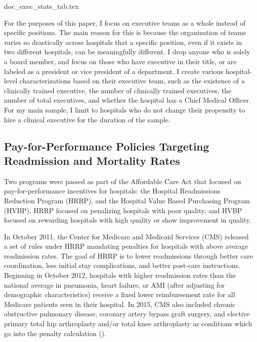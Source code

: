 \documentclass[12pt]{article}
\begin{document}
    {doc_exec_stats_tab.tex}

    For the purposes of this paper, I focus on executive teams as a whole instead of specific positions. The main reason for this is because the organization of teams varies so drastically across hospitals that a specific position, even if it exists in two different hospitals, can be meaningfully different. I drop anyone who is solely a board member, and focus on those who have executive in their title, or are labeled as a president or vice president of a department. I create various hospital-level characterizations based on their executive team, such as the existence of a clinically trained executive, the number of clinically trained executives, the number of total executives, and whether the hospital has a Chief Medical Officer. For my main sample, I limit to hospitals who do not change their propensity to hire a clinical executive for the duration of the sample. 
  
    \subsection{Pay-for-Performance Policies Targeting Readmission and Mortality Rates}\label{sec:hrrp}

    Two programs were passed as part of the Affordable Care Act that focused on pay-for-performance incentives for hospitals: the Hospital Readmissions Reduction Program (HRRP), and the Hospital Value Based Purchasing Program (HVBP). HRRP focused on penalizing hospitals with poor quality, and HVBP focused on rewarding hospitals with high quality or show improvement in quality. 

    In October 2011, the Center for Medicare and Medicaid Services (CMS) released a set of rules under HRRP mandating penalties for hospitals with above average readmission rates. The goal of HRRP is to lower readmissions through better care coordination, less initial stay complications, and better post-care instructions. Beginning in October 2012, hospitals with higher readmission rates than the national average in pneumonia, heart failure, or AMI (after adjusting for demographic characteristics) receive a fixed lower reimbursement rate for all Medicare patients seen in their hospital. In 2015, CMS also included chronic obstructive pulmonary disease, coronary artery bypass graft surgery, and elective primary total hip arthroplasty and/or total knee arthroplasty as conditions which go into the penalty calculation (\cite{CMS}). 
    
\end{document}
